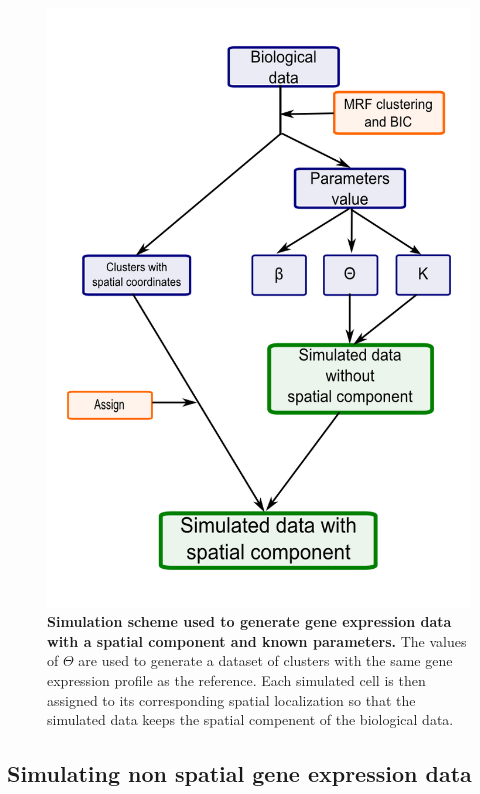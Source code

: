	\begin{figure}[h]
\centerline{\includegraphics[width=\linewidth]{gfx/chapter5/simulation_scheme.png}}
\caption{{\bf Simulation scheme used to generate gene expression data with a spatial component and known parameters.} The values of $\Theta$ are used to generate a dataset of clusters with the same gene expression profile as the reference. Each simulated cell is then assigned to its corresponding spatial localization so that the simulated data keeps the spatial compenent of the biological data.}
\label{fig:simulationScheme}
	\end{figure}
	
	\subsection{Simulating non spatial gene expression data}\label{subsec:simul_non_spatial}
